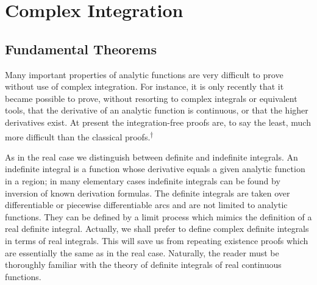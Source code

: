 \chapter{Complex Integration}\label{chap:4}

\setcounter{section}{0}\section{Fundamental Theorems}\label{sec:4.1}
Many important properties of analytic functions are very difficult to prove without use of complex integration. For instance, it is only recently that it became possible to prove, without resorting to complex integrals or equivalent tools, that the derivative of an analytic function is continuous, or that the higher derivatives exist. At present the integration-free proofs are, to say the least, much more difficult than the classical proofs.\hyperlink{fn:117:dagger}{\textsuperscript{\ensuremath{\dagger}}}

As in the real case we distinguish between definite and indefinite integrals. An indefinite integral is a function whose derivative equals a given analytic function in a region; in many elementary cases indefinite integrals can be found by inversion of known derivation formulas. The definite integrals are taken over differentiable or piecewise differentiable arcs and are not limited to analytic functions. They can be defined by a limit process which mimics the definition of a real definite integral. Actually, we shall prefer to define complex definite integrals in terms of real integrals. This will save us from repeating existence proofs which are essentially the same as in the real case. Naturally, the reader must be thoroughly familiar with the theory of definite integrals of real continuous functions.


